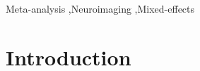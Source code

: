 \documentclass[preprint]{elsarticle}
\begin{document}
\begin{frontmatter}
\begin{abstract}
\end{abstract}

\begin{keyword}
Meta-analysis \sep Neuroimaging \sep Mixed-effects


\end{keyword}

\end{frontmatter}


\section{Introduction}




 
\end{document}
